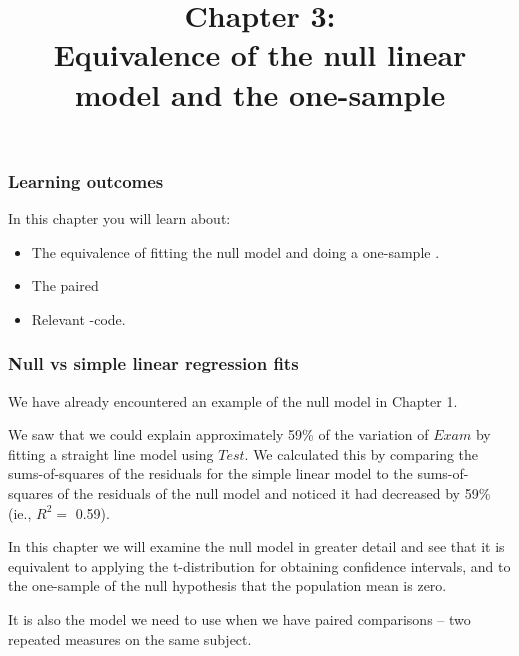 \documentclass{beamer}\usepackage[]{graphicx}\usepackage[]{xcolor}
\begin{document}
\newcommand{\thechapter}{3}



\title{Chapter 3: \\ Equivalence of the null linear model and the one-sample \ttest{}}

\begin{frame}
\titlepage
\end{frame}


\begin{frame}[t]
\frametitle{Learning outcomes}
In this chapter you will learn about:
\begin{center}
\vspace{16pt}
\begin{minipage}{0.8\textwidth}
  \begin{itemize}
  \item The equivalence of fitting the null model and doing a one-sample \ttest{}.
  \item The paired \ttest{}
  \item Relevant -code.
  \end{itemize}
\end{minipage}
\end{center}
\end{frame}






\begin{frame}[fragile]
\frametitle{Null vs simple linear regression fits}

We have already encountered an example of the null model in Chapter 1.

We saw that we could explain approximately 59\% of the variation of $Exam$ by fitting a straight line model using $Test$. 
We calculated  this by comparing the sums-of-squares of the residuals for the simple linear model to the sums-of-squares of the residuals of the null model and noticed it had decreased by 59\% (ie., $R^2=$ 0.59).

In this chapter we will examine the null model in greater detail and see that it is equivalent to applying the t-distribution for obtaining confidence intervals, and to the  one-sample \ttest{} of the null hypothesis that the population mean is zero.

It is also the model we need to use when we have paired comparisons  --  two repeated measures on the same subject.
\end{frame}
\end{document}
